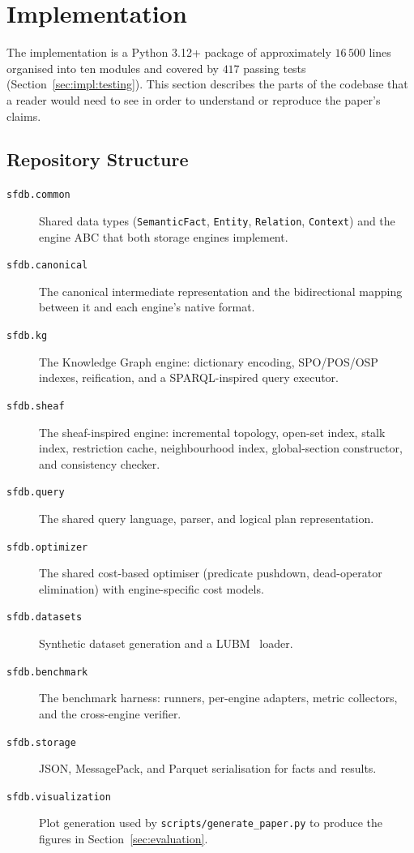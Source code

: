 \section{Implementation}
\label{sec:implementation}

The implementation is a Python 3.12+ package of approximately $16\,500$
lines organised into ten modules and covered by $417$ passing tests
(Section~\ref{sec:impl:testing}). This
section describes the parts of the codebase that a reader would need to see
in order to understand or reproduce the paper's claims.

\subsection{Repository Structure}
\label{sec:impl:repository}

\begin{description}
    \item[\texttt{sfdb.common}] Shared data types (\texttt{SemanticFact},
          \texttt{Entity}, \texttt{Relation}, \texttt{Context}) and the
          engine ABC that both storage engines implement.
    \item[\texttt{sfdb.canonical}] The canonical intermediate
          representation and the bidirectional mapping between it and each
          engine's native format.
    \item[\texttt{sfdb.kg}] The Knowledge Graph engine: dictionary
          encoding, SPO/POS/OSP indexes, reification, and a SPARQL-inspired
          query executor.
    \item[\texttt{sfdb.sheaf}] The sheaf-inspired engine: incremental
          topology, open-set index, stalk index, restriction cache,
          neighbourhood index, global-section constructor, and consistency
          checker.
    \item[\texttt{sfdb.query}] The shared query language, parser, and
          logical plan representation.
    \item[\texttt{sfdb.optimizer}] The shared cost-based optimiser
          (predicate pushdown, dead-operator elimination) with
          engine-specific cost models.
    \item[\texttt{sfdb.datasets}] Synthetic dataset generation and a
          LUBM~\cite{guo2005lubm} loader.
    \item[\texttt{sfdb.benchmark}] The benchmark harness: runners,
          per-engine adapters, metric collectors, and the cross-engine
          verifier.
    \item[\texttt{sfdb.storage}] JSON, MessagePack, and Parquet
          serialisation for facts and results.
    \item[\texttt{sfdb.visualization}] Plot generation used by
          \texttt{scripts/generate\_paper.py} to produce the figures in
          Section~\ref{sec:evaluation}.
\end{description}

